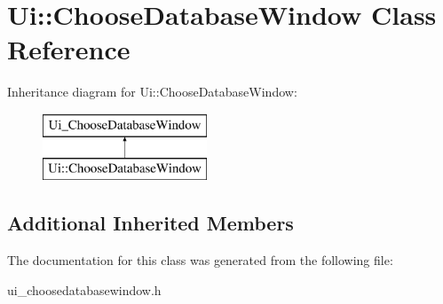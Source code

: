 \hypertarget{class_ui_1_1_choose_database_window}{}\section{Ui\+:\+:Choose\+Database\+Window Class Reference}
\label{class_ui_1_1_choose_database_window}
Inheritance diagram for Ui\+:\+:Choose\+Database\+Window\+:\begin{figure}[H]
\begin{center}
\leavevmode
\includegraphics[height=2.000000cm]{class_ui_1_1_choose_database_window}
\end{center}
\end{figure}
\subsection*{Additional Inherited Members}


The documentation for this class was generated from the following file\+:\begin{DoxyCompactItemize}
\item 
ui\+\_\+choosedatabasewindow.\+h\end{DoxyCompactItemize}
